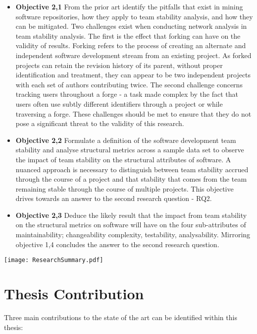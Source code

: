 \begin{itemize}
\begin{itemize}
\item \textbf{Objective 2,1} From the prior art identify the pitfalls that exist in mining software repositories, how they apply to team stability analysis, and how they can be mitigated. Two challenges exist when conducting network analysis in team stability analysis. The first is the effect that forking can have on the validity of results. Forking refers to the process of creating an alternate and independent software development stream from an existing project. As forked projects can retain the revision history of its parent, without proper identification and treatment, they can appear to be two independent projects with each set of authors contributing twice. The second challenge concerns tracking users throughout a forge - a task made complex by the fact that users often use subtly different identifiers through a project or while traversing a forge. These challenges should be met to ensure that they do not pose a significant threat to the validity of this research.
\item \textbf{Objective 2,2} Formulate a definition of the software development team stability and analyse structural metrics across a sample data set to observe the impact of team stability on the structural attributes of software. A nuanced approach is necessary to distinguish between team stability accrued through the course of a project and that stability that comes from the team remaining stable through the course of multiple projects. This objective drives towards an answer to the second research question - RQ2.
\item \textbf{Objective 2,3} Deduce the likely result that the impact from team stability on the structural metrics on software will have on the four sub-attributes of maintainability; changeability complexity, testability, analysability. Mirroring objective 1,4 concludes the answer to the second research question.
\end{itemize}
\end{itemize}

\begin{table}
\begin{tabular}
 \centering 
 \texttt{[image: ResearchSummary.pdf]}
 \label{tab:researchSummary}
\end{tabular}
\end{table}

\section{Thesis Contribution} %
Three main contributions to the state of the art can be identified within this thesis:

